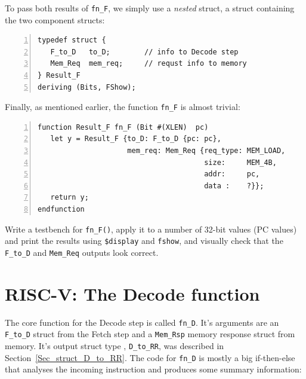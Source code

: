 \vspace*{2ex}


To pass both results of \verb|fn_F|, we simply use a \emph{nested}
struct, {\ie} a struct containing the two component structs:

\begin{Verbatim}[frame=single, numbers=left]
typedef struct {
   F_to_D   to_D;        // info to Decode step
   Mem_Req  mem_req;     // requst info to memory
} Result_F
deriving (Bits, FShow);
\end{Verbatim}

Finally, as mentioned earlier, the function \verb|fn_F| is almost
trivial:

\begin{Verbatim}[frame=single, numbers=left]
function Result_F fn_F (Bit #(XLEN)  pc)
   let y = Result_F {to_D: F_to_D {pc: pc},
                     mem_req: Mem_Req {req_type: MEM_LOAD,
                                       size:     MEM_4B,
                                       addr:     pc,
                                       data :    ?}};
   return y;
endfunction
\end{Verbatim}


\hdivider

\Exercise

Write a testbench for \verb|fn_F()|, apply it to a number of 32-bit
values (PC values) and print the results using \verb|$display| and
\verb|fshow|, and visually check that the \verb|F_to_D| and
\verb|Mem_Req| outputs look correct.

\Endexercise


\section{RISC-V: The Decode function}

\label{Sec_Combo_Decode}


The core function for the Decode step is called \verb|fn_D|.  It's
arguments are an \verb|F_to_D| struct from the Fetch step and a
\verb|Mem_Rsp| memory response struct from memory.  It's output struct
type , \verb|D_to_RR|, was described in
Section~\ref{Sec_struct_D_to_RR}.  The code for \verb|fn_D| is mostly
a big if-then-else that analyses the incoming instruction and produces
some summary information:

